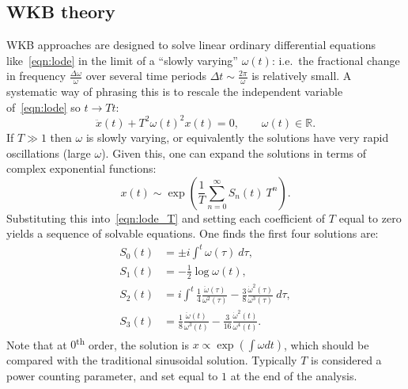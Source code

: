 \subsection{WKB theory}
\label{sec:wkb}
WKB approaches are designed to solve linear ordinary differential equations like~\eqref{eqn:lode} in the limit of a ``slowly varying'' $\omega(t)$: i.e.\ the fractional change in frequency $\frac{\Delta\omega}{\omega}$ over several time periods $\Delta t \sim \frac{2\pi}{\omega}$ is relatively small.
A systematic way of phrasing this is to rescale the independent variable of~\eqref{eqn:lode} so $t\rightarrow T t$:
\begin{equation}
  \ddot{x}(t) + T^2{\omega(t)}^2x(t) = 0,\qquad \omega(t)\in\mathbb{R}.
  \label{eqn:lode_T}
\end{equation}
If $T\gg1$ then $\omega$ is slowly varying, or equivalently the solutions have very rapid oscillations (large $\omega$). Given this, one can expand the solutions in terms of complex exponential functions:
\begin{equation}
  x(t)\sim \exp\left( \frac{1}{T}\sum\limits_{n=0}^{\infty} S_n(t)\: T^n \right).
  \label{eqn:asymp}
\end{equation}
Substituting this into~\eqref{eqn:lode_T} and setting each coefficient of $T$ equal to zero yields a sequence of solvable equations. One finds the first four solutions are:
\begin{align}
  S_0(t) &= \pm i \int^t \omega(\tau)\: d\tau,
  \label{eqn:S0}\\
  S_1(t) &= -\frac{1}{2}\log \omega(t),\\
  S_2(t) &=  i \int^t \frac{1}{4}\frac{\ddot{\omega}(\tau)}{\omega^{2}(\tau)} - \frac{3}{8}\frac{\dot{\omega}^2(\tau)}{\omega^{3}(\tau)}\: d\tau, \\
  S_3(t) &=  \frac{1}{8}\frac{\ddot{\omega}(t)}{\omega^{3}(t)} - \frac{3}{16} \frac{\dot{\omega}^{2}(t)}{\omega^{4}(t)}.
\end{align}
Note that at $0$\textsuperscript{th} order, the solution is $x\propto\exp\left( \int \omega dt \right)$, which should be compared with the traditional sinusoidal solution.
Typically $T$ is considered a power counting parameter, and set equal to $1$ at the end of the analysis.

